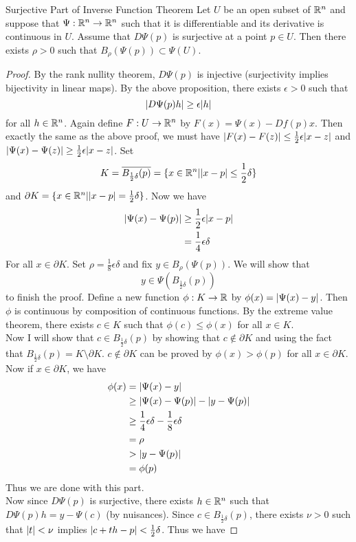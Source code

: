 \documentclass[a4paper]{article}
\begin{document}
\begin{prp}{Surjective Part of Inverse Function Theorem}{} Let $U$ be an open subset of $\mathbb{R}^n$ and suppose that $\Psi:\mathbb{R}^n\to\mathbb{R}^n$ such that it is differentiable and its derivative is continuous in $U$. Assume that $D\Psi(p)$ is surjective at a point $p\in U$. Then there exists $\rho>0$ such that $B_\rho(\Psi(p))\subset\Psi(U)$. 
\begin{proof}
By the rank nullity theorem, $D\Psi(p)$ is injective (surjectivity implies bijectivity in linear maps). By the above proposition, there exists $\epsilon>0$ such that $$\abs{D\Psi(p)h}\geq\epsilon\abs{h}$$ for all $h\in\mathbb{R}^n$. Again define $F:U\to\mathbb{R}^n$ by $F(x)=\Psi(x)-Df(p)x$. Then exactly the same as the above proof, we must have $\abs{F(x)-F(z)}\leq\frac{1}{2}\epsilon\abs{x-z}$ and $\abs{\Psi(x)-\Psi(z)}\geq\frac{1}{2}\epsilon\abs{x-z}$. Set $$K=\overline{B_{\frac{1}{2}\delta}(p)}=\{x\in\mathbb{R}^n|\abs{x-p}\leq\frac{1}{2}\delta\}$$ and $\partial K=\{x\in\mathbb{R}^n|\abs{x-p}=\frac{1}{2}\delta\}$. 
Now we have 
\begin{align*}
\abs{\Psi(x)-\Psi(p)}&\geq\frac{1}{2}\epsilon\abs{x-p}\\
&=\frac{1}{4}\epsilon\delta
\end{align*}
For all $x\in\partial K$. Set $\rho=\frac{1}{8}\epsilon\delta$ and fix $y\in B_\rho(\Psi(p))$. We will show that $$y\in\Psi(B_{\frac{1}{2}\delta}(p))$$ to finish the proof. Define a new function $\phi:K\to \mathbb{R}$ by $\phi(x)=\abs{\Psi(x)-y}$. Then $\phi$ is continuous by composition of continuous functions. By the extreme value theorem, there exists $c\in K$ such that $\phi(c)\leq\phi(x)$ for all $x\in K$. \\
Now I will show that $c\in B_{\frac{1}{2}\delta}(p)$ by showing that $c\notin\partial K$ and using the fact that $B_{\frac{1}{2}\delta}(p)=K\setminus\partial{K}$. $c\notin\partial K$ can be proved by $\phi(x)>\phi(p)$ for all $x\in\partial K$. Now if $x\in\partial K$, we have
\begin{align*}
\phi(x)&=\abs{\Psi(x)-y}\\
&\geq\abs{\Psi(x)-\Psi(p)}-\abs{y-\Psi(p)}\\
&\geq\frac{1}{4}\epsilon\delta-\frac{1}{8}\epsilon\delta\\
&=\rho\\
&>\abs{y-\Psi(p)}\\
&=\phi(p)
\end{align*}
Thus we are done with this part. \\
Now since $D\Psi(p)$ is surjective, there exists $h\in\mathbb{R}^n$ such that $D\Psi(p)h=y-\Psi(c)$ (by nuisances). Since $c\in B_{\frac{1}{2}\delta}(p)$, there exists $\nu>0$ such that $\abs{t}<\nu$ implies $\abs{c+th-p}<\frac{1}{2}\delta$. Thus we have 

\end{proof}
\end{prp}
\end{document}
